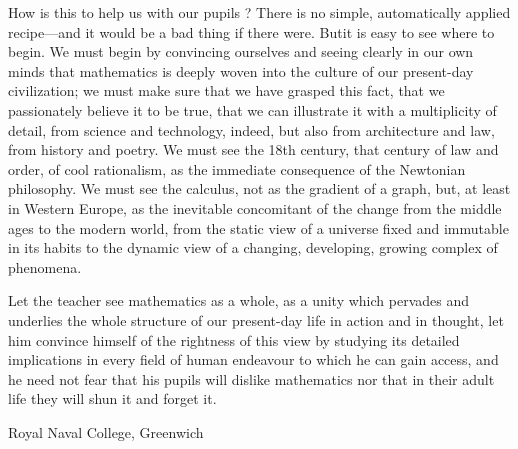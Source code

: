 How is this to help us with our pupils ? There is no simple, automatically applied recipe---and it would be a bad thing if there were. But\pageoriginale it is easy to see where to begin. We must begin by convincing ourselves and seeing clearly in our own minds that mathematics is deeply woven into the culture of our present-day civilization; we must make sure that we have grasped this fact, that we passionately believe it to be true, that we can illustrate it with a multiplicity of detail, from science and technology, indeed, but also from architecture and law, from history and poetry. We must see the 18th century, that century of law and order, of cool rationalism, as the immediate consequence of the Newtonian philosophy. We must see the calculus, not as the gradient of a graph, but, at least in Western Europe, as the inevitable concomitant of the change from the middle ages to the modern world, from the static view of a universe fixed and immutable in its habits to the dynamic view of a changing, developing, growing complex of phenomena.

Let the teacher see mathematics as a whole, as a unity which pervades and underlies the whole structure of our present-day life in action and in thought, let him convince himself of the rightness of this view by studying its detailed implications in every field of human endeavour to which he can gain access, and he need not fear that his pupils will dislike mathematics nor that in their adult life they will shun it and forget it.

\bigskip
\medskip
{\fontsize{9pt}{11pt}\selectfont
Royal Naval College, Greenwich
}
